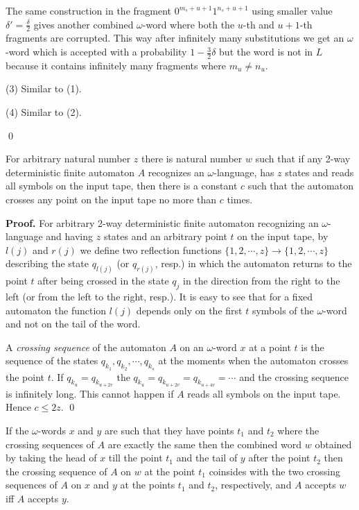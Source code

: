 \documentclass{llncs}
\begin{document}
The same construction in the fragment $0^{m_s+u+1}1^{n_s+u+1}$ using smaller value  $\delta ' = \frac{\delta }{2}$ gives another combined $\omega $-word where both the $u$-th and $u+1$-th fragments are corrupted. This way after infinitely many substitutions we get an $\omega $-word which is accepted with a probability 
$1- \frac{3}{2}\delta $ but the word is not in $L$ because it contains infinitely many fragments where $m_u \neq n_u$.

\bigskip

(3) Similar to (1).

\bigskip

(4) Similar to (2).

\qed



\begin{lemma} 
\label{L1}
For arbitrary natural number $z$ there is natural number $w$ such that
if any 2-way deterministic finite automaton $A$ recognizes an $\omega $-language, has $z$ states and reads all symbols on the input tape, then there is a constant $c$ such that the automaton  crosses any point on the input tape
no more than $c$ times.
\end{lemma}

{\bf Proof.}  For arbitrary  2-way deterministic finite automaton recognizing an $\omega $-language and having $z$ states and an arbitrary point $t$ on the input tape, by $l(j)$ and $r(j)$  we define two reflection functions $\{1,2,\cdots ,z\} \to \{1,2,\cdots ,z\}$ describing the state $q_{l(j)}$ (or $q_{r(j)}$, resp.) in which the automaton returns to the point $t$ after being crossed in the state $q_j$ in the direction from the right to the left (or from the left to the right, resp.). It is easy to see that for a fixed automaton the function $l(j)$ depends only on the first $t$ symbols of the $\omega $-word and not on the tail of the word.

A {\em crossing sequence} of the automaton $A$ on an $\omega $-word $x$  at a point $t$ is the sequence of the states $q_{k_1}, q_{k_2}, \cdots , q_{k_s}$ at the moments when the automaton crosses the point $t$. If $q_{k_u} = q_{k_{u+2v}}$ the $q_{k_u} = q_{k_{u+2v}} =  q_{k_{u+4v}} = \cdots$ and the crossing sequence is infinitely long. This cannot happen if $A$ reads all symbols on the input tape. Hence $c \leq 2z$. \qed


\begin{lemma}
\label{L2} 
If the $\omega $-words $x$ and $y$ are such that they have points $t_1$ and $t_2$ where the crossing sequences of $A$ are exactly the same then the combined word $w$ obtained by taking the head of $x$ till the point $t_1$ and the tail of $y$ after the point $t_2$ then the crossing sequence of $A$ on $w$ at the point $t_1$ coinsides with the two crossing sequences of $A$ on $x$ and $y$ at the points
$t_1$ and $t_2$, respectively, and $A$ accepts $w$ iff $A$ accepts $y$.
\end{lemma}
\end{document}

